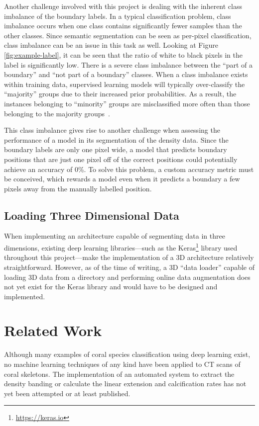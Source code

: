 Another challenge involved with this project is dealing with the inherent class imbalance of the boundary labels. In a typical classification problem, class imbalance occurs when one class contains significantly fewer samples than the other classes. Since semantic segmentation can be seen as per-pixel classification, class imbalance can be an issue in this task as well. Looking at Figure \ref{fig:example-label}, it can be seen that the ratio of white to black pixels in the label is significantly low. There is a severe class imbalance between the ``part of a boundary'' and ``not part of a boundary'' classes. When a class imbalance exists within training data, supervised learning models will typically over-classify the ``majority'' groups due to their increased prior probabilities. As a result, the instances belonging to ``minority'' groups are misclassified more often than those belonging to the majority groups~\cite{classimbalance}.

This class imbalance gives rise to another challenge when assessing the performance of a model in its segmentation of the density data. Since the boundary labels are only one pixel wide, a model that predicts boundary positions that are just one pixel off of the correct positions could potentially achieve an accuracy of 0\%. To solve this problem, a custom accuracy metric must be conceived, which rewards a model even when it predicts a boundary a few pixels away from the manually labelled position.

\subsection{Loading Three Dimensional Data}

When implementing an architecture capable of segmenting data in three dimensions, existing deep learning libraries---such as the Keras\footnote{\url{https://keras.io}} library used throughout this project---make the implementation of a 3D architecture relatively straightforward. However, as of the time of writing, a 3D ``data loader'' capable of loading 3D data from a directory and performing online data augmentation does not yet exist for the Keras library and would have to be designed and implemented.

\section{Related Work}

Although many examples of coral species classification using deep learning exist, no machine learning techniques of any kind have been applied to CT scans of coral skeletons. The implementation of an automated system to extract the density banding or calculate the linear extension and calcification rates has not yet been attempted or at least published.

